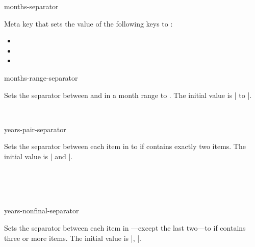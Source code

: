 \documentclass{beerydoc}
\begin{document}
\begin{codedoc}{months-separator}
  \begin{syntax}
  \end{syntax}
  Meta key that sets the value of the following keys to :
  \begin{itemize}
    \item {}
    \item {}
    \item {}
  \end{itemize}
\end{codedoc}

\begin{codedoc}{months-range-separator}
  \begin{syntax}
  \end{syntax}
  Sets the separator between  and  in a month range
  to .
  The initial value is | to |.
  \begin{codedemo}
    \\
  \end{codedemo}
\end{codedoc}

\begin{codedoc}{years-pair-separator}
  \begin{syntax}
  \end{syntax}
  Sets the separator between each item in  to  if
   contains exactly two items.
  The initial value is | and |.
  \begin{codedemo}
    \\
    \\
    \\
  \end{codedemo}
\end{codedoc}

\begin{codedoc}{years-nonfinal-separator}
  \begin{syntax}
  \end{syntax}
  Sets the separator between each item in ---except the last
  two---to  if  contains three or more items.
  The initial value is |, |.
  \begin{codedemo}
    \\
    \\
    \\
  \end{codedemo}
\end{codedoc}
\end{document}
